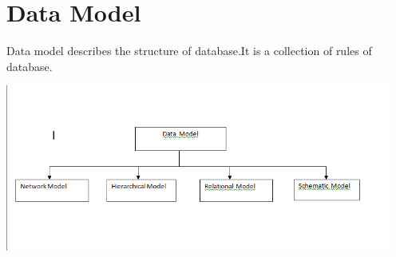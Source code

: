 \documentclass{article}
\begin{document}
\section{Data Model}

Data model describes the structure of database.It is a collection of rules of database.

\includegraphics[width=5in]{dbms3.png}
\end{document}
